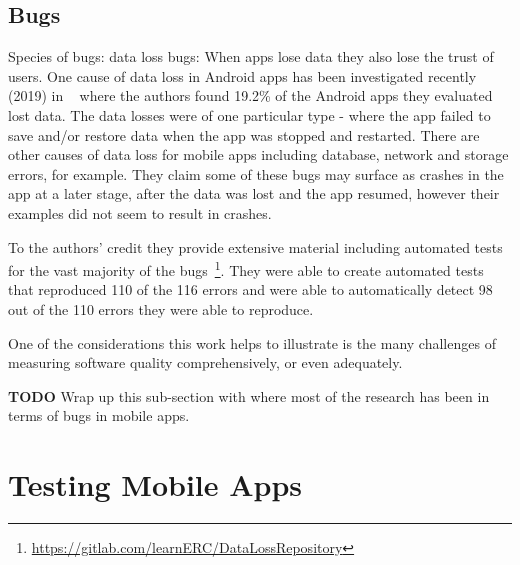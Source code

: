 \subsection{Bugs}
Species of bugs: data loss bugs: When apps lose data they also lose the trust of users. One cause of data loss in Android apps has been investigated recently (2019) in ~\cite{riganelli2019benchmark_android_data_loss_bugs} where the authors found 19.2\% of the Android apps they evaluated lost data. The data losses were of one particular type - where the app failed to save and/or restore data when the app was stopped and restarted. There are other causes of data loss for mobile apps including database, network and storage errors, for example. They claim some of these bugs may surface as crashes in the app at a later stage, after the data was lost and the app resumed, however their examples did not seem to result in crashes.  

To the authors' credit they provide extensive material including automated tests for the vast majority of the bugs~\footnote{\url{https://gitlab.com/learnERC/DataLossRepository}}. They were able to create automated tests that reproduced 110 of the 116 errors and were able to automatically detect 98 out of the 110 errors they were able to reproduce.

One of the considerations this work helps to illustrate is the many challenges of measuring software quality comprehensively, or even adequately.

\textbf{TODO} Wrap up this sub-section with where most of the research has been in terms of bugs in mobile apps.

\hypertarget{mobile.testing}{}
\section{Testing Mobile Apps}

